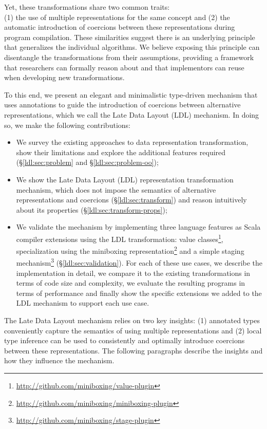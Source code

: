 Yet, these transformations share two common traits:\\ (1) the use of multiple representations for the same concept and (2) the automatic introduction of coercions between these representations during program compilation. These similarities suggest there is an underlying principle that generalizes the individual algorithms. We believe exposing this principle can disentangle the transformations from their assumptions, providing a framework that researchers can formally reason about and that implementors can reuse when developing new transformations.

To this end, we present an elegant and minimalistic type-driven mechanism that uses annotations to guide the introduction of coercions between alternative representations, which we call the Late Data Layout (LDL) mechanism. In doing so, we make the following contributions:

\begin{itemize}
\item We survey the existing approaches to data representation transformation, show their limitations and explore the additional features required (\S\ref{ldl:sec:problem} and \S\ref{ldl:sec:problem-oo});
\item We show the Late Data Layout (LDL) representation transformation mechanism, which does not impose the semantics of alternative representations and coercions (\S\ref{ldl:sec:transform}) and reason intuitively about its properties (\S\ref{ldl:sec:transform-props});
\item We validate the mechanism by implementing three language features as Scala compiler extensions using the LDL transformation: value classes\footnote{\url{http://github.com/miniboxing/value-plugin}}, specialization using the miniboxing representation\footnote{\url{http://github.com/miniboxing/miniboxing-plugin}} and a simple staging mechanism\footnote{\url{http://github.com/miniboxing/stage-plugin}} (\S\ref{ldl:sec:validation}). For each of these use cases, we describe the implementation in detail, we compare it to the existing transformations in terms of code size and complexity, we evaluate the resulting programs in terms of performance and finally show the specific extensions we added to the LDL mechanism to support each use case.
\end{itemize}

\noindent The Late Data Layout mechanism relies on two key insights: (1) annotated types conveniently capture the semantics of using multiple representations and (2) local type inference can be used to consistently and optimally introduce coercions between these representations. The following paragraphs describe the insights and how they influence the mechanism.

